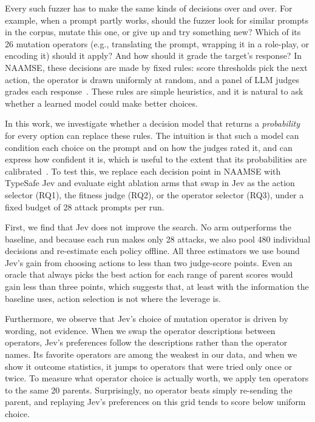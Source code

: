 \documentclass{article}
\begin{document}
Every such fuzzer has to make the same kinds of decisions over and over.
For example, when a prompt partly works, should the fuzzer look for similar prompts in the corpus, mutate this one, or give up and try something new?
Which of its 26 mutation operators (e.g., translating the prompt, wrapping it in a role-play, or encoding it) should it apply?
And how should it grade the target's response?
In NAAMSE, these decisions are made by fixed rules: score thresholds pick the next action, the operator is drawn uniformly at random, and a panel of LLM judges grades each response~\citep{zheng2023judging}.
These rules are simple heuristics, and it is natural to ask whether a learned model could make better choices.

In this work, we investigate whether a decision model that returns a \emph{probability} for every option can replace these rules.
The intuition is that such a model can condition each choice on the prompt and on how the judges rated it, and can express how confident it is, which is useful to the extent that its probabilities are calibrated~\citep{guo2017calibration}.
To test this, we replace each decision point in NAAMSE with TypeSafe Jev and evaluate eight ablation arms that swap in Jev as the action selector (RQ1), the fitness judge (RQ2), or the operator selector (RQ3), under a fixed budget of 28 attack prompts per run.

First, we find that Jev does not improve the search.
No arm outperforms the baseline, and because each run makes only 28 attacks, we also pool 480 individual decisions and re-estimate each policy offline.
All three estimators we use bound Jev's gain from choosing actions to less than two judge-score points.
Even an oracle that always picks the best action for each range of parent scores would gain less than three points, which suggests that, at least with the information the baseline uses, action selection is not where the leverage is.

Furthermore, we observe that Jev's choice of mutation operator is driven by wording, not evidence.
When we swap the operator descriptions between operators, Jev's preferences follow the descriptions rather than the operator names.
Its favorite operators are among the weakest in our data, and when we show it outcome statistics, it jumps to operators that were tried only once or twice.
To measure what operator choice is actually worth, we apply ten operators to the same 20 parents.
Surprisingly, no operator beats simply re-sending the parent, and replaying Jev's preferences on this grid tends to score below uniform choice.
\end{document}
